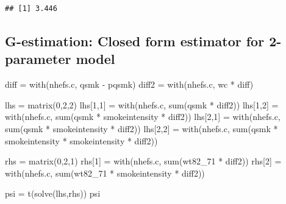 \documentclass[
  10pt,
]{book}
\newenvironment{Shaded}{\begin{snugshade}}{\end{snugshade}}
\newcommand{\DecValTok}[1]{\textcolor[rgb]{0.00,0.00,0.81}{#1}}
\newcommand{\FunctionTok}[1]{\textcolor[rgb]{0.00,0.00,0.00}{#1}}
\newcommand{\NormalTok}[1]{#1}
\newcommand{\OtherTok}[1]{\textcolor[rgb]{0.56,0.35,0.01}{#1}}
\newcommand{\SpecialCharTok}[1]{\textcolor[rgb]{0.00,0.00,0.00}{#1}}
\begin{document}
\begin{verbatim}
## [1] 3.446
\end{verbatim}

\hypertarget{g-estimation-closed-form-estimator-for-2-parameter-model}{%
\subsection{G-estimation: Closed form estimator for 2-parameter model}\label{g-estimation-closed-form-estimator-for-2-parameter-model}}

\begin{Shaded}
\begin{Highlighting}[]
\NormalTok{diff }\OtherTok{=} \FunctionTok{with}\NormalTok{(nhefs.c, qsmk }\SpecialCharTok{{-}}\NormalTok{ pqsmk)}
\NormalTok{diff2 }\OtherTok{=} \FunctionTok{with}\NormalTok{(nhefs.c, wc }\SpecialCharTok{*}\NormalTok{ diff)}

\NormalTok{lhs }\OtherTok{=} \FunctionTok{matrix}\NormalTok{(}\DecValTok{0}\NormalTok{,}\DecValTok{2}\NormalTok{,}\DecValTok{2}\NormalTok{)}
\NormalTok{lhs[}\DecValTok{1}\NormalTok{,}\DecValTok{1}\NormalTok{] }\OtherTok{=} \FunctionTok{with}\NormalTok{(nhefs.c, }\FunctionTok{sum}\NormalTok{(qsmk }\SpecialCharTok{*}\NormalTok{ diff2))}
\NormalTok{lhs[}\DecValTok{1}\NormalTok{,}\DecValTok{2}\NormalTok{] }\OtherTok{=} \FunctionTok{with}\NormalTok{(nhefs.c, }\FunctionTok{sum}\NormalTok{(qsmk }\SpecialCharTok{*}\NormalTok{ smokeintensity  }\SpecialCharTok{*}\NormalTok{ diff2))}
\NormalTok{lhs[}\DecValTok{2}\NormalTok{,}\DecValTok{1}\NormalTok{] }\OtherTok{=} \FunctionTok{with}\NormalTok{(nhefs.c, }\FunctionTok{sum}\NormalTok{(qsmk }\SpecialCharTok{*}\NormalTok{ smokeintensity }\SpecialCharTok{*}\NormalTok{ diff2))}
\NormalTok{lhs[}\DecValTok{2}\NormalTok{,}\DecValTok{2}\NormalTok{] }\OtherTok{=} \FunctionTok{with}\NormalTok{(nhefs.c, }\FunctionTok{sum}\NormalTok{(qsmk }\SpecialCharTok{*}\NormalTok{ smokeintensity }\SpecialCharTok{*}\NormalTok{ smokeintensity }\SpecialCharTok{*}\NormalTok{ diff2))}

\NormalTok{rhs }\OtherTok{=} \FunctionTok{matrix}\NormalTok{(}\DecValTok{0}\NormalTok{,}\DecValTok{2}\NormalTok{,}\DecValTok{1}\NormalTok{)}
\NormalTok{rhs[}\DecValTok{1}\NormalTok{] }\OtherTok{=} \FunctionTok{with}\NormalTok{(nhefs.c, }\FunctionTok{sum}\NormalTok{(wt82\_71 }\SpecialCharTok{*}\NormalTok{ diff2))}
\NormalTok{rhs[}\DecValTok{2}\NormalTok{] }\OtherTok{=} \FunctionTok{with}\NormalTok{(nhefs.c, }\FunctionTok{sum}\NormalTok{(wt82\_71 }\SpecialCharTok{*}\NormalTok{ smokeintensity }\SpecialCharTok{*}\NormalTok{ diff2))}

\NormalTok{psi }\OtherTok{=} \FunctionTok{t}\NormalTok{(}\FunctionTok{solve}\NormalTok{(lhs,rhs))}
\NormalTok{psi}
\end{Highlighting}
\end{Shaded}
\end{document}
